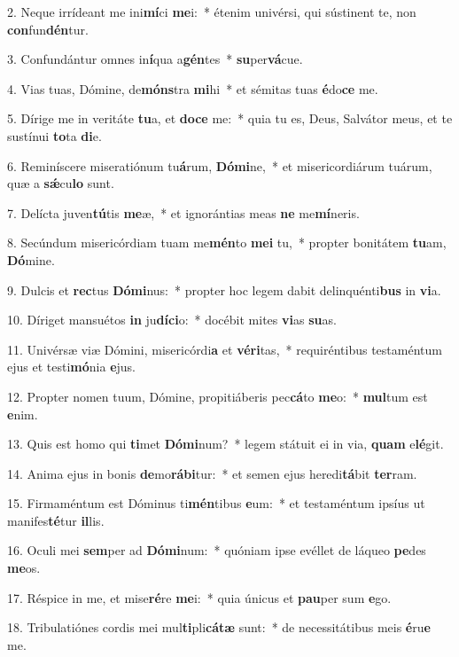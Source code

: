 2. Neque irrídeant me ini\textbf{mí}ci \textbf{me}i:~*  étenim univérsi, qui sústinent te, non \textbf{con}fun\textbf{dén}tur.\

3. Confundántur omnes in\textbf{í}qua a\textbf{gén}tes~*  \textbf{su}per\textbf{vá}cue.\

4. Vias tuas, Dómine, de\textbf{móns}tra \textbf{mi}hi~*  et sémitas tuas \textbf{é}do\textbf{ce} me.\

5. Dírige me in veritáte \textbf{tu}a, et \textbf{do}\textbf{ce} me:~*  quia tu es, Deus, Salvátor meus, et te sustínui \textbf{to}ta \textbf{di}e.\

6. Reminíscere miseratiónum tu\textbf{á}rum, \textbf{Dó}\textbf{mi}ne,~*  et misericordiárum tuárum, quæ a \textbf{sǽ}cu\textbf{lo} sunt.\

7. Delícta juven\textbf{tú}tis \textbf{me}æ,~*  et ignorántias meas \textbf{ne} me\textbf{mí}neris.\

8. Secúndum misericórdiam tuam me\textbf{mén}to \textbf{me}\textbf{i} tu,~*  propter bonitátem \textbf{tu}am, \textbf{Dó}mine.\

9. Dulcis et \textbf{rec}tus \textbf{Dó}\textbf{mi}nus:~*  propter hoc legem dabit delinquénti\textbf{bus} in \textbf{vi}a.\

10. Díriget mansuétos \textbf{in} ju\textbf{dí}\textbf{ci}o:~*  docébit mites \textbf{vi}as \textbf{su}as.\

11. Univérsæ viæ Dómini, misericórdi\textbf{a} et \textbf{vé}\textbf{ri}tas,~*  requiréntibus testaméntum ejus et testi\textbf{mó}nia \textbf{e}jus.\

12. Propter nomen tuum, Dómine, propitiáberis pec\textbf{cá}to \textbf{me}o:~*  \textbf{mul}tum est \textbf{e}nim.\

13. Quis est homo qui \textbf{ti}met \textbf{Dó}\textbf{mi}num?~*  legem státuit ei in via, \textbf{quam} e\textbf{lé}git.\

14. Anima ejus in bonis \textbf{de}mo\textbf{rá}\textbf{bi}tur:~*  et semen ejus heredi\textbf{tá}bit \textbf{ter}ram.\

15. Firmaméntum est Dóminus ti\textbf{mén}tibus \textbf{e}um:~*  et testaméntum ipsíus ut manifes\textbf{té}tur \textbf{il}lis.\

16. Oculi mei \textbf{sem}per ad \textbf{Dó}\textbf{mi}num:~*  quóniam ipse evéllet de láqueo \textbf{pe}des \textbf{me}os.\

17. Réspice in me, et mise\textbf{ré}re \textbf{me}i:~*  quia únicus et \textbf{pau}per sum \textbf{e}go.\

18. Tribulatiónes cordis mei mul\textbf{ti}pli\textbf{cá}\textbf{tæ} sunt:~*  de necessitátibus meis \textbf{é}ru\textbf{e} me.\

